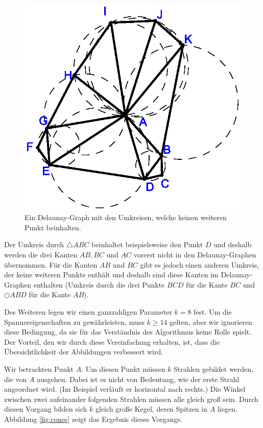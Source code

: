 \documentclass[a4paper,twoside]{IEEEtran}
\begin{document}
\begin{figure}[h!]
\centering
\includegraphics[width=0.7\linewidth]{Delaunay_Graph.eps}
\caption{Ein Delaunay-Graph mit den Umkreisen, welche keinen weiteren Punkt beinhalten.}
\label{fig:delaunay}
\end{figure}

Der Umkreis durch $\triangle{ABC} $ beinhaltet beispielsweise den Punkt $D $ und deshalb werden die drei Kanten $AB, BC $ und $AC $ vorerst nicht in den Delaunay-Graphen übernommen.
Für die Kanten $AB $ und $BC $ gibt es jedoch einen anderen Umkreis, der keine weiteren Punkte enthält und deshalb sind diese Kanten im Delaunay-Graphen enthalten (Umkreis durch die drei Punkte $BCD $ für die Kante $BC $ und  $\bigcirc{ABD} $ für die Kante $AB $).

Des Weiteren legen wir einen ganzzahligen Parameter $k=8 $ fest.
Um die Spannereigenschaften zu gewährleisten, muss $k \geq 14 $ gelten, aber wir ignorieren diese Bedingung, da sie für das Verständnis des Algorithmus keine Rolle spielt.
Der Vorteil, den wir durch diese Vereinfachung erhalten, ist, dass die Übersichtlichkeit der Abbildungen verbessert wird.

Wir betrachten Punkt $A $.
Um diesen Punkt müssen $k $ Strahlen gebildet werden, die von $A $ ausgehen.
Dabei ist es nicht von Bedeutung, wie der erste Strahl angeordnet wird. (Im Beispiel verläuft er horizontal nach rechts.)
Die Winkel zwischen zwei aufeinander folgenden Strahlen müssen alle gleich groß sein.
Durch diesen Vorgang bilden sich $k $ gleich große Kegel, deren Spitzen in $A $ liegen.
Abbildung \ref{fig:cones} zeigt das Ergebnis dieses Vorgangs.
\end{document}
